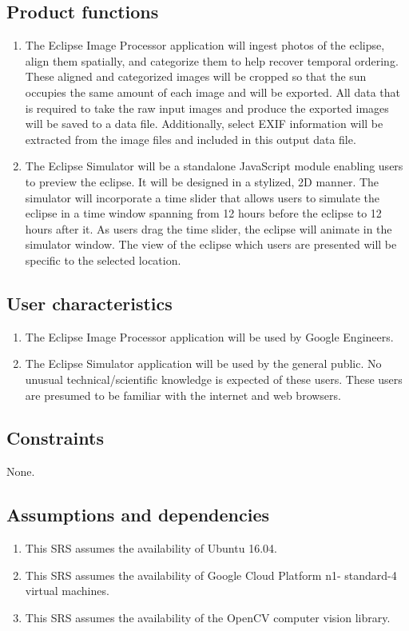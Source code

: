 \documentclass[10pt, onecolumn, draftclsnofoot, letterpaper, compsoc]{IEEEtran}
\begin{document}
\subsection{Product functions}
	\begin{enumerate}
		\item The Eclipse Image Processor application will ingest 
			photos of the eclipse, align them spatially, and categorize
			them to help recover temporal ordering. These aligned and 
			categorized images will be cropped so that the sun 
			occupies the same amount of each image and will be 
			exported. All data that is required to take the raw input 
			images and produce the exported images will be saved to a 
			data file. Additionally, select EXIF information will be 
			extracted from the image files and included in this output
			data file.
		\item The Eclipse Simulator will be a standalone JavaScript 
			module enabling users to preview the eclipse. It will be 
			designed in a stylized, 2D manner. The simulator will 
			incorporate a time slider that allows users to simulate the 
			eclipse in a time window spanning from 12 hours before the 
			eclipse to 12 hours after it. As users drag the time 
			slider, the eclipse will animate in the simulator window. 
			The view of the eclipse which users are presented will be 
			specific to the selected location.
	\end{enumerate}

\subsection{User characteristics}
	\begin{enumerate}
		\item The Eclipse Image Processor application will be used by 
			Google Engineers.

		\item The Eclipse Simulator application will be used by the
		general public. No unusual technical/scientific knowledge is
		expected of these users. These users are presumed to be
		familiar with the internet and web browsers.
	\end{enumerate}

\subsection{Constraints}
None.

\subsection{Assumptions and dependencies}
	\begin{enumerate}
		\item This SRS assumes the availability of Ubuntu 16.04.
		\item This SRS assumes the availability of Google Cloud Platform n1-
		standard-4 virtual machines.
		\item This SRS assumes the availability of the OpenCV computer 
		vision library.
	\end{enumerate}
\end{document}
